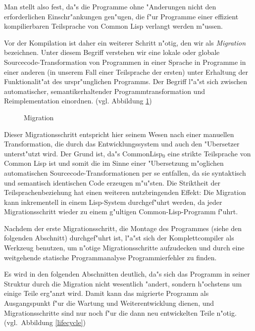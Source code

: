Man stellt also fest, da"s die Programme ohne "Anderungen nicht den
erforderlichen Einschr"ankungen gen"ugen, die f"ur Programme einer
effizient kompilierbaren Teilsprache von Common Lisp verlangt werden
m"ussen. 

Vor der Kompilation ist daher ein weiterer Schritt n"otig, den wir als
{\em Migration} bezeichnen. Unter diesem Begriff verstehen wir eine
lokale oder globale Sourcecode-Transformation von Programmen in einer
Sprache in Programme in einer anderen (in unserem Fall einer Teilsprache
der ersten) unter Erhaltung der Funktionalit"at des urspr"unglichen
Programms. Der Begriff l"a"st sich zwischen automatischer,
semantikerhaltender Programmtransformation und Reimplementation
einordnen. (vgl. Abbildung \ref{migration})
\begin{figure*}[htb] %
\def\epsfsize#1#2{0.4#1}
\centerline{}
\vspace*{0.6cm}
\caption{Migration \label{migration}}
\end{figure*}

Dieser Migrationsschritt entspricht hier seinem Wesen nach einer
manuellen Transformation, die durch das Entwicklungssystem und auch den
"Ubersetzer unterst"utzt wird. Der Grund ist, da"s CommonLisp$_0$ eine
strikte Teilsprache von Common Lisp ist und somit die im Sinne einer
"Ubersetzung m"oglichen automatischen Sourcecode-Transformationen per
se entfallen, da sie syntaktisch und semantisch identischen Code
erzeugen m"u"sten. Die Striktheit der Teilsprachenbeziehung hat einen
weiteren nutzbringenden Effekt: Die Migration kann inkrementell in
einem Lisp-System durchgef"uhrt werden, da jeder Migrationsschritt
wieder zu einem g"ultigen Common-Lisp-Programm f"uhrt. 

Nachdem der erste Migrationsschritt, die Montage des Programmes (siehe
den folgenden Abschnitt) durchgef"uhrt ist, l"a"st sich der
Komplettcompiler als Werkzeug benutzen, um n"otige Migrationsschritte
aufzudecken und durch eine weitgehende statische Programmanalyse
Programmierfehler zu finden.

Es wird in den folgenden Abschnitten deutlich, da"s sich das Programm
in seiner Struktur durch die Migration nicht wesentlich "andert,
sondern h"ochstens um einige Teile erg"anzt wird. Damit kann das
migrierte Programm als Ausgangspunkt f"ur die Wartung und
Weiterentwicklung dienen, und Migrationsschritte sind nur noch
f"ur die dann neu entwickelten Teile n"otig. (vgl.\ Abbildung
\ref{lifecycle})

